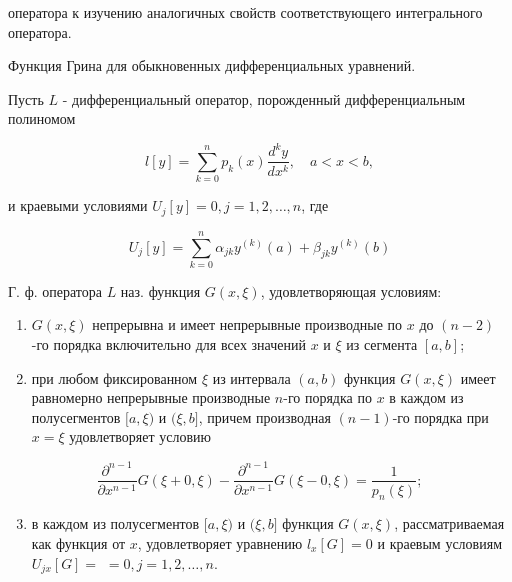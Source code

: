 \documentclass[10pt]{article}
\begin{document}
оператора к изучению аналогичных свойств соответствующего интегрального оператора.



Функция Грина для обыкновенных дифференциальных уравнений.



Пусть $L$ - дифференциальный оператор, порожденный дифференциальным полиномом



\[

l[y]=\sum_{k=0}^{n} p_{k}(x) \frac{d^{k} y}{d x^{k}}, \quad a<x<b,

\]



и краевыми условиями $U_{j}[y]=0, j=1,2, \ldots, n$, где



\[

U_{j}[y]=\sum_{k=0}^{n} \alpha_{j k} y^{(k)}(a)+\beta_{j k} y^{(k)}(b)

\]



Г. ф. оператора $L$ наз. функция $G(x, \xi)$, удовлетворяющая условиям:



\begin{enumerate}

  \item $G(x, \xi)$ непрерывна и имеет непрерывные производные по $x$ до $(n-2)$-го порядка включительно для всех значений $x$ и $\xi$ из сегмента $[a, b]$;



  \item при любом фиксированном $\xi$ из интервала $(a, b)$ функция $G(x, \xi)$ имеет равномерно непрерывные производные $n$-го порядка по $x$ в каждом из полусегментов $[a, \xi)$ и $(\xi, b]$, причем производная $(n-1)$-го порядка при $x=\xi$ удовлетворяет условию



\end{enumerate}



\[

\frac{\partial^{n-1}}{\partial x^{n-1}} G(\xi+0, \xi)-\frac{\partial^{n-1}}{\partial x^{n-1}} G(\xi-0, \xi)=\frac{1}{p_{n}(\xi)} ;

\]



\begin{enumerate}

  \setcounter{enumi}{2}

  \item в каждом из полусегментов $[a, \xi)$ и $(\xi, b]$ функция $G(x, \xi)$, рассматриваемая как функция от $x$, удовлетворяет уравнению $l_{x}[G]=0$ и краевым условиям $U_{j x}[G]=$ $=0, j=1,2, \ldots, n$.

\end{enumerate}
\end{document}
